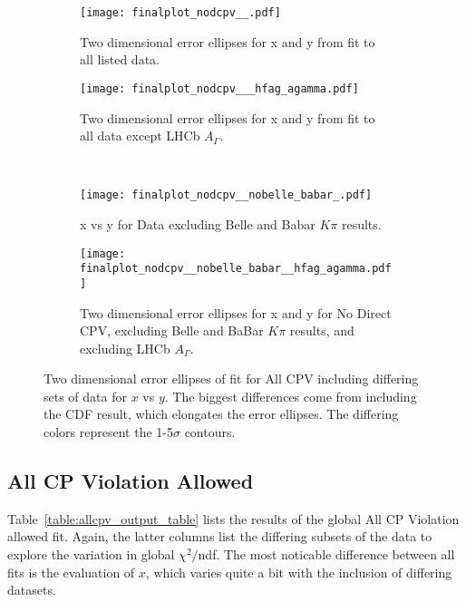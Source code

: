 

\begin{figure}[htb]
  \begin{center}
    \begin{subfigure}[b]{0.4\textwidth}
      \centering
      \texttt{[image: finalplot\_nodcpv\_\_.pdf]}
      \caption{Two dimensional error ellipses for x and y from fit to all listed data.}
      \label{fig:all_nodcpv}
    \end{subfigure}%
    \hspace{2mm}
    \begin{subfigure}[b]{0.4\textwidth}
      \centering
      \texttt{[image: finalplot\_nodcpv\_\_\_hfag\_agamma.pdf]}
      \caption{Two dimensional error ellipses for x and y from fit to all data except LHCb $A_\Gamma$.}
      \label{fig:all_nodcpv_no_lhcb_agamma}
    \end{subfigure}%
    \\
    \begin{subfigure}[b]{0.4\textwidth}
      \centering
      \texttt{[image: finalplot\_nodcpv\_\_nobelle\_babar\_.pdf]}
      \caption{x vs y for Data excluding Belle and Babar $K \pi$ results.}
      \label{fig:nodcpv_no_belle_babar}
    \end{subfigure}%
    \hspace{2mm}
    \begin{subfigure}[b]{0.4\textwidth}
      \centering
      \texttt{[image: finalplot\_nodcpv\_\_nobelle\_babar\_\_hfag\_agamma.pdf]}
      \caption{Two dimensional error ellipses for x and y for No Direct CPV, excluding Belle and BaBar $K\pi$ results, and excluding LHCb $A_\Gamma$.}
      \label{fig:nodcpv_no_belle_babar_no_lhcb_agamma}
    \end{subfigure}%
  \end{center}
  \caption{Two dimensional error ellipses of fit for All CPV including differing sets of data for $x$ vs $y$. The biggest differences come from including the CDF result, which elongates the error ellipses. The differing colors represent the 1-5$\sigma$ contours.}
  \label{fig:xy_nodcpv_variations}
\end{figure}


\subsection{All CP Violation Allowed}
Table~\ref{table:allcpv_output_table} lists the results of the global All CP Violation
allowed fit. Again, the latter columns list the differing subsets of the data to explore
the variation in global $\chi^2/$ndf. The most noticable difference between all fits
is the evaluation of $x$, which varies quite a bit with the inclusion of differing datasets.


